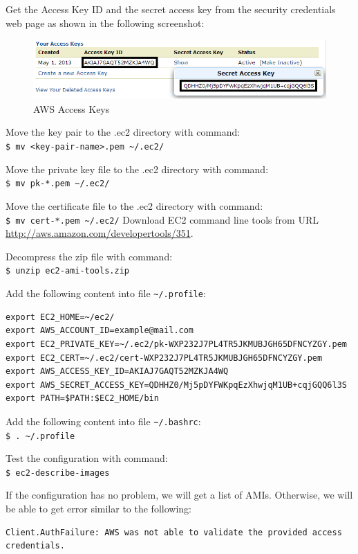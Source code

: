 Get the Access Key ID and the secret access key from the security credentials web page as shown in the following screenshot:
\begin{figure}[h]
  \centering
  \includegraphics[width=.8\textwidth]{figs/5163os_08_15.png}
  \caption{AWS Access Keys}\label{fig:aws.access.keys}
\end{figure} 

Move the key pair to the .ec2 directory with command: \\
\verb|$ mv <key-pair-name>.pem ~/.ec2/|

Move the private key file to the .ec2 directory with command: \\
\verb|$ mv pk-*.pem ~/.ec2/|

Move the certificate file to the .ec2 directory with command: \\
\verb|$ mv cert-*.pem ~/.ec2/|
Download EC2 command line tools from URL \url{http://aws.amazon.com/developertools/351}.


Decompress the zip file with command: \\
\verb|$ unzip ec2-ami-tools.zip|

Add the following content into file \verb|~/.profile|:
\lstset{style=bashstyle}
\begin{lstlisting}
export EC2_HOME=~/ec2/
export AWS_ACCOUNT_ID=example@mail.com
export EC2_PRIVATE_KEY=~/.ec2/pk-WXP232J7PL4TR5JKMUBJGH65DFNCYZGY.pem
export EC2_CERT=~/.ec2/cert-WXP232J7PL4TR5JKMUBJGH65DFNCYZGY.pem
export AWS_ACCESS_KEY_ID=AKIAJ7GAQT52MZKJA4WQ
export AWS_SECRET_ACCESS_KEY=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
export PATH=$PATH:$EC2_HOME/bin
\end{lstlisting}

Add the following content into file \verb|~/.bashrc|: \\
\verb|$ . ~/.profile|

Test the configuration with command: \\
\verb|$ ec2-describe-images|

If the configuration has no problem, we will get a list of AMIs. Otherwise, we will be able to get error similar to the following:
\lstset{style=bashstyle}
\begin{lstlisting}
Client.AuthFailure: AWS was not able to validate the provided access credentials.
\end{lstlisting}
